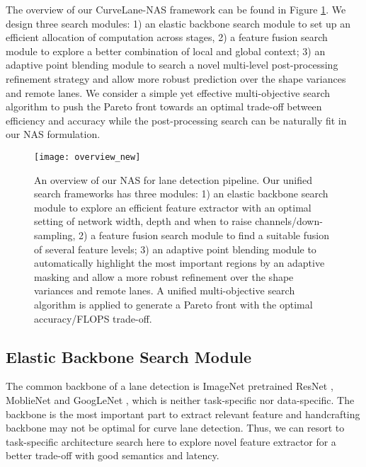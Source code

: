 \documentclass[runningheads]{llncs}
\begin{document}
The overview of our CurveLane-NAS framework can be found in Figure
\ref{fig:framework-graph}. We design three search modules: 1) an
elastic backbone search module to set up an efficient allocation of
computation across stages, 2) a feature fusion search module to explore
a better combination of local and global context; 3) an adaptive point
blending module to search a novel multi-level post-processing refinement
strategy and allow more robust prediction over the shape variances
and remote lanes. We consider a simple yet effective multi-objective
search algorithm to push the Pareto front towards an optimal trade-off
between efficiency and accuracy while the post-processing search can
be naturally fit in our NAS formulation. 

\begin{figure}[t]
\begin{centering}
\texttt{[image: overview\_new]}
\par\end{centering}


\caption{\label{fig:framework-graph}An overview of our NAS for lane detection
pipeline. Our unified search frameworks has three modules: 1) an elastic
backbone search module to explore an efficient feature extractor with
an optimal setting of network width, depth and when to raise channels/down-sampling,
2) a feature fusion search module to find a suitable fusion of several
feature levels; 3) an adaptive point blending module to automatically
highlight the most important regions by an adaptive masking and allow
a more robust refinement over the shape variances and remote lanes. A unified multi-objective search algorithm
is applied to generate a Pareto front with the optimal accuracy/FLOPS
trade-off.}


\end{figure}


\subsection{Elastic Backbone Search Module}

The common backbone of a lane detection is ImageNet pretrained ResNet
\cite{he2016deep}, MoblieNet \cite{sandler2018mobilenetv2} and GoogLeNet
\cite{szegedy2015going}, which is neither task-specific nor data-specific.
The backbone is the most important part to extract relevant feature
and handcrafting backbone may not be optimal for curve lane detection.
Thus, we can resort to task-specific architecture search here to explore
novel feature extractor for a better trade-off with good semantics
and latency. 
\end{document}
